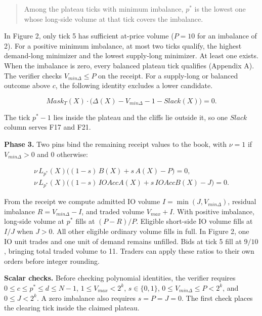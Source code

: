 \begin{quote}
Among the plateau ticks with minimum imbalance, \(p^*\) is the lowest one whose long-side volume at that tick covers the imbalance.
\end{quote}

In Figure 2, only tick 5 has sufficient at-price volume (\(P=10\) for an imbalance of 2). For a positive minimum imbalance, at most two ticks qualify, the highest demand-long minimizer and the lowest supply-long minimizer. At least one exists. When the imbalance is zero, every balanced plateau tick qualifies (Appendix A). The verifier checks \(V_{min\Delta}\le P\) on the receipt. For a supply-long or balanced outcome above \(c\), the following identity excludes a lower candidate.

\[Mask_T(X) \cdot \big(\Delta(X) - V_{min\Delta} - 1 - Slack(X)\big) = 0. \tag{F21}\]

The tick \(p^* - 1\) lies inside the plateau and the cliffs lie outside it, so one \(Slack\) column serves F17 and F21.

\textbf{Phase 3.} Two pins bind the remaining receipt values to the book, with \(\nu = 1\) if \(V_{min\Delta} > 0\) and 0 otherwise:

\begin{equation}
\begin{gathered}
\nu\,L_{p^*}(X)\bigl((1-s)\,B(X) + s\,A(X) - P\bigr) = 0, \\
\nu\,L_{p^*}(X)\bigl((1-s)\,IOAccA(X) + s\,IOAccB(X) - J\bigr) = 0.
\end{gathered}
\tag{F32, F33}
\end{equation}

From the receipt we compute admitted IO volume \(I=\min(J,V_{min\Delta})\), residual imbalance \(R=V_{min\Delta}-I\), and traded volume \(V_{max}+I\). With positive imbalance, long-side volume at \(p^*\) fills at \((P-R)/P\). Eligible short-side IO volume fills at \(I/J\) when \(J>0\). All other eligible ordinary volume fills in full. In Figure 2, one IO unit trades and one unit of demand remains unfilled. Bids at tick 5 fill at \(9/10\), bringing total traded volume to 11. Traders can apply these ratios to their own orders before integer rounding.

\textbf{Scalar checks.} Before checking polynomial identities, the verifier requires \(0\le c\le p^*\le d\le N-1\), \(1\le V_{max}<2^k\), \(s\in\{0,1\}\), \(0\le V_{min\Delta}\le P<2^k\), and \(0\le J<2^k\). A zero imbalance also requires \(s=P=J=0\). The first check places the clearing tick inside the claimed plateau.

